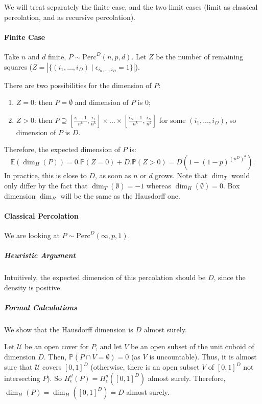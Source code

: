 We will treat separately the finite case, and the two limit cases (limit as classical percolation, and as recursive percolation).

\paragraph{Finite Case}
Take $n$ and $d$ finite, $P \sim \text{Perc}^D(n,p,d)$.
Let $Z$ be the number of remaining squares ($Z = | \{ (i_1,\dots,i_D) \mid \epsilon_{i_n,\dots,i_D} = 1 \} |$).

There are two possibilities for the dimension of $P$:
\begin{enumerate}
	\item $Z=0$: then $P = \emptyset$ and dimension of $P$ is $0$;
	\item $Z>0$: then $P \supseteq \left[ \frac{i_1-1}{n^k},\frac{i_1}{n^k} \right] \times \dots \times \left[ \frac{i_D-1}{n^k},\frac{i_D}{n^k} \right]$ for some $(i_1,\dots,i_D)$, so dimension of $P$ is $D$.
\end{enumerate}
Therefore, the expected dimension of $P$ is:
$$
\mathbb{E}(\dim_H(P)) = 0.\mathbb{P}(Z=0) + D.\mathbb{P}(Z>0) = D \left( 1 - \left( 1-p\right) ^{\left( n^D \right)^d} \right).
$$
In practice, this is close to $D$, as soon as $n$ or $d$ grows.
Note that $\dim_T$ would only differ by the fact that $\dim_T(\emptyset) = -1$ whereas $\dim_H(\emptyset) = 0$.
Box dimension $\dim_B$ will be the same as the Hausdorff one.

\paragraph{Classical Percolation}
We are looking at $P \sim \text{Perc}^D(\infty,p,1)$.
\subparagraph{Heuristic Argument}
Intuitively, the expected dimension of this percolation should be $D$, since the density is positive.
\subparagraph{Formal Calculations}
We show that the Hausdorff dimension is $D$ almost surely.

Let $\mathcal{U}$ be an open cover for $P$, and let $V$ be an open subset of the unit cuboid of dimension $D$.
Then, $\mathbb{P}(P \cap V = \emptyset) = 0$ (as $V$ is uncountable).
Thus, it is almost sure that $\mathcal{U}$ covers $\left[ 0,1 \right]^D$ (otherwise, there is an open subset $V$ of $\left[ 0,1 \right]^D$ not intersecting $P$).
So $H_{\epsilon}^d(P) = H_{\epsilon}^d\left( \left[ 0,1 \right]^D \right)$ almost surely.
Therefore, $\dim_H(P) = \dim_H(\left[ 0,1 \right]^D) = D$ almost surely.

